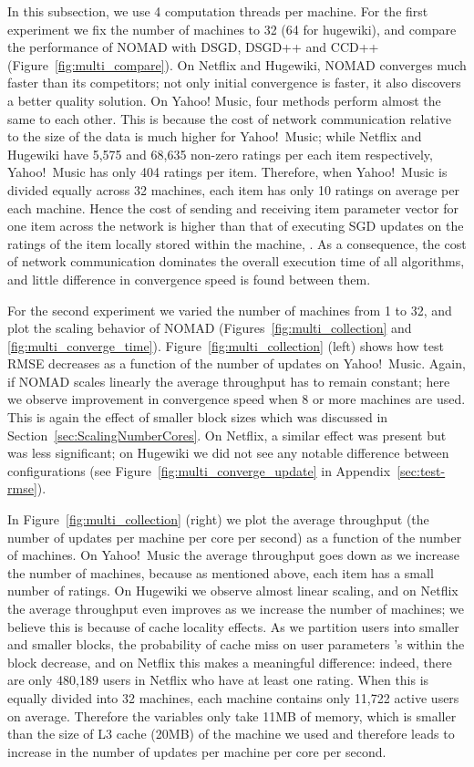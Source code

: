 \documentclass{vldb}
\begin{document}
In this subsection, we use 4 computation threads per machine.  For the
first experiment we fix the number of machines to 32 (64 for hugewiki),
and compare the performance of NOMAD with DSGD, DSGD++ and CCD++
(Figure~\ref{fig:multi_compare}).  On Netflix and Hugewiki, NOMAD
converges much faster than its competitors; not only initial convergence
is faster, it also discovers a better quality solution.  On Yahoo!
Music, four methods perform almost the same to each other. This is
because the cost of network communication relative to the size of the
data is much higher for Yahoo!\ Music; while Netflix and Hugewiki have
5,575 and 68,635 non-zero ratings per each item respectively, Yahoo!\
Music has only 404 ratings per item.  Therefore, when Yahoo!~Music
is divided equally across 32 machines, each item has only 10
ratings on average per each machine.  Hence the cost of sending and
receiving item parameter vector  for one item  across the
network is higher than that of executing SGD updates on the ratings of
the item locally stored within the machine, .  As a
consequence, the cost of network communication dominates the overall
execution time of all algorithms, and little difference in convergence
speed is found between them.

For the second experiment we varied the number of machines from 1 to 32,
and plot the scaling behavior of NOMAD
(Figures~\ref{fig:multi_collection} and \ref{fig:multi_converge_time}).
Figure~\ref{fig:multi_collection} (left) shows how test RMSE decreases
as a function of the number of updates on Yahoo!~Music.  Again, if NOMAD
scales linearly the average throughput has to remain constant; here we
observe improvement in convergence speed when 8 or more machines are
used.  This is again the effect of smaller block sizes which was
discussed in Section~\ref{sec:ScalingNumberCores}.  On Netflix, a
similar effect was present but was less significant; on Hugewiki we did
not see any notable difference between configurations (see
Figure~\ref{fig:multi_converge_update} in
Appendix~\ref{sec:test-rmse}). 

In Figure~\ref{fig:multi_collection} (right) we plot the average
throughput (the number of updates per machine per core per second) as a
function of the number of machines.  On Yahoo!~Music the average
throughput goes down as we increase the number of machines, because as
mentioned above, each item has a small number of ratings.  On Hugewiki
we observe almost linear scaling, and on Netflix the average throughput
even improves as we increase the number of machines; we believe this is
because of cache locality effects.  As we partition users into smaller
and smaller blocks, the probability of cache miss on user parameters
's within the block decrease, and on Netflix this makes a
meaningful difference: indeed, there are only 480,189 users in Netflix
who have at least one rating.  When this is equally divided into 32
machines, each machine contains only 11,722 active users on average.
Therefore the  variables only take 11MB of memory, which is
smaller than the size of L3 cache (20MB) of the machine we used and
therefore leads to increase in the number of updates per machine per
core per second.
\end{document}

